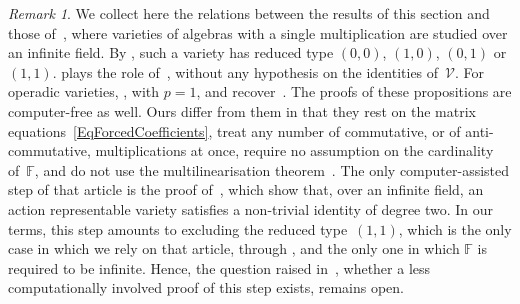 \documentclass[reqno,a4paper]{amsart}
\theoremstyle{plain}
\theoremstyle{definition}
\theoremstyle{remark}
\newtheorem{remark}[subsection]{Remark}
\numberwithin{equation}{section}
\newcommand{\F}{\mathbb{F}}
\newcommand{\V}{\mathcal{V}}
\begin{document}
\begin{remark}\label{RemarkComparisonSingle}
We collect here the relations between the results of this section and those of~\cite{Tim}, where varieties of algebras with a single multiplication are studied over an infinite field. By , such a variety has reduced type $(0,0)$, $(1,0)$, $(0,1)$ or $(1,1)$.  plays the role of~\cite[Proposition~1.3]{Tim}, without any hypothesis on the identities of~$\V$. For operadic varieties, , with $p=1$, and  recover~\cite[Propositions~4.1, 4.3 and~5.1]{Tim}. The proofs of these propositions are computer-free as well. Ours differ from them in that they rest on the matrix equations~\eqref{EqForcedCoefficients}, treat any number of commutative, or of anti-commutative, multiplications at once, require no assumption on the cardinality of~$\F$, and do not use the multilinearisation theorem~\cite[Theorem~1.5]{Tim}. The only computer-assisted step of that article is the proof of~\cite[Propositions~3.1 and~3.4]{Tim}, which show that, over an infinite field, an action representable variety satisfies a non-trivial identity of degree two. In our terms, this step amounts to excluding the reduced type~$(1,1)$, which is the only case in which we rely on that article, through , and the only one in which $\F$ is required to be infinite. Hence, the question raised in~\cite[Section~6.5]{Tim}, whether a less computationally involved proof of this step exists, remains open.
\end{remark}
\end{document}
